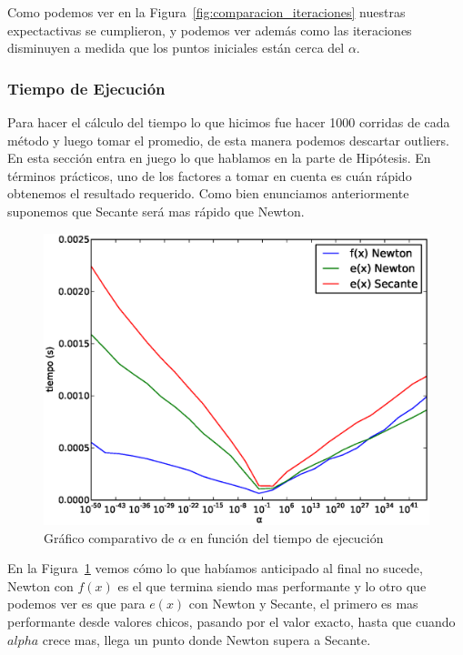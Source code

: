 Como podemos ver en la Figura~\ref{fig:comparacion_iteraciones} nuestras expectactivas se cumplieron, y podemos ver además como las iteraciones disminuyen a medida que los puntos iniciales están cerca del $\alpha$.


\subsubsection{Tiempo de Ejecución} %
\label{ssub:tiempo_de_ejecuci_n}

Para hacer el cálculo del tiempo lo que hicimos fue hacer 1000 corridas de cada método y luego tomar el promedio, de esta manera podemos descartar outliers. En esta sección entra en juego lo que hablamos en la parte de Hipótesis. En términos prácticos, uno de los factores a tomar en cuenta es cuán rápido obtenemos el resultado requerido. Como bien enunciamos anteriormente suponemos que Secante será mas rápido que Newton.\\

\begin{figure}[!htbp]
  \begin{center}
    \includegraphics[scale=0.5]{graficos/new/comparacion_tiempos.eps}
    \caption{\label{fig:comparacion_tiempos} Gráfico comparativo de $\alpha$ en función del tiempo de ejecución}
  \end{center}
\end{figure}

En la Figura~\ref{fig:comparacion_tiempos} vemos cómo lo que habíamos anticipado al final no sucede, Newton con $f(x)$ es el que termina siendo mas performante y lo otro que podemos ver es que para $e(x)$ con Newton y Secante, el primero es mas performante desde valores chicos, pasando por el valor exacto, hasta que cuando $alpha$ crece mas, llega un punto donde Newton supera a Secante.\\

